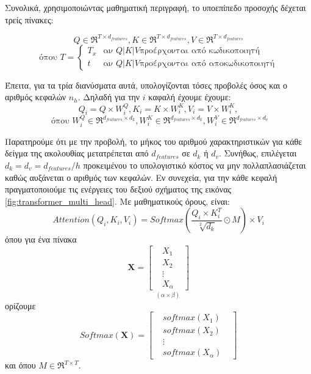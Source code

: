 Συνολικά, χρησιμοποιώντας μαθηματική περιγραφή, το υπο\textendash επίπεδο προσοχής δέχεται τρείς πίνακες:

\begin{equation}
  Q \in \Re^{T \times d_{features}},K \in \Re^{T \times d_{features}}, V \in \Re^{T \times d_{features}}
\end{equation}
\begin{equation}
  \text{όπου } T = \begin{cases} 
    T_x & \text{αν } Q | K | V \text{προέρχονται από κωδικοποιητή}\\
    t & \text{αν } Q | K | V \text{προέρχονται από αποκωδικοποιητή}
  \end{cases} 
\end{equation}
 

  
  Έπειτα, για τα τρία διανύσματα αυτά, υπολογίζονται τόσες προβολές όσος και ο αριθμός κεφαλών $n_h$. Δηλαδή για την $i$ καφαλή έχουμε έχουμε:
  \begin{equation}
    Q_i = Q\times W_i^Q, K_i = K \times W_i^K, V_i = V \times W_i^K,
  \end{equation}
  \begin{equation}
    \text{ όπου } W_i^Q \in \Re^{d_{features} \times d_k}, W_i^K \in \Re^{d_{features} \times d_k}, W_i^V \in \Re^{d_{features} \times d_v}
  \end{equation}

  Παρατηρούμε ότι με την προβολή, το μήκος του αριθμού χαρακτηριστικών για κάθε δείγμα της ακολουθίας μετατρέπεται από $d_{features}$ σε $d_k$ ή $d_v$. Συνήθως, επιλέγεται $d_k = d_v = d_{features}/h$ προκειμένου το υπολογιστικό κόστος να μην πολλαπλασιάζεται καθώς αυξάνεται ο αριθμός των κεφαλών.
  Εν συνεχεία, για την κάθε κεφαλή πραγματοποιούμε τις ενέργειες του δεξιού σχήματος της εικόνας \ref{fig:transformer_multi_head}. Με μαθηματικούς όρους, είναι:
  \[
    Attention(Q_i, K_i, V_i) = Softmax(\frac{Q_i\times K_i^T}{\sqrt[2]{d_k}} \odot M) \times V_i
    \]
    όπου για ένα πίνακα 
    \[ 
      \boldsymbol{X} = \underset{(\alpha \times \beta)}{\begin{bmatrix}
        & X_1 &  \\
        & X_2 &  \\
        & \vdots & \\
        & X_{\alpha} &  
      \end{bmatrix}}
      \] 
      ορίζουμε
    \[
      Softmax(\boldsymbol{X}) =
      \begin{bmatrix}
        & softmax(X_1) &  \\
        & softmax(X_2) &  \\
        & \vdots & \\
        & softmax(X_{\alpha}) &  
      \end{bmatrix}
        \]
        και όπου $M \in \Re^{T \times T}$.


